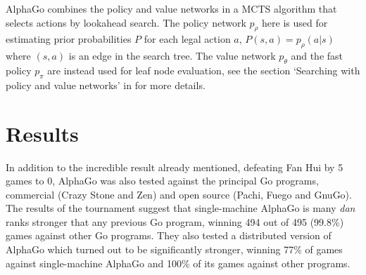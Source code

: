 \documentclass[10pt,a4paper]{article}
\begin{document}
AlphaGo combines the policy and value networks in a MCTS algorithm that selects actions by lookahead search. 
The policy network $p_{\rho}$ here is used for estimating prior probabilities $P$ for each legal action $a$, $P(s, a) = p_{\rho}(a \vert s)$ where $(s, a)$ is an edge in the search tree. 
The value network $p_{\theta}$ and the fast policy $p_{\pi}$ are instead used for leaf node evaluation, see the section `Searching with policy and value networks'  in \cite{AlphaGoNature} for more details.

\section{Results}
In addition to the incredible result already mentioned, defeating Fan Hui by 5 games to 0, AlphaGo was also tested against the principal Go programs, commercial (Crazy Stone and Zen) and open source (Pachi, Fuego and GnuGo). 
The results of the tournament suggest that single-machine AlphaGo is many \textit{dan} ranks stronger that any previous Go program, winning 494 out of 495 (99.8\%) games against other Go programs. 
They also tested a distributed version of AlphaGo which turned out to be significantly stronger, winning 77\% of games against single-machine AlphaGo and 100\% of its games against other programs.



\end{document}
